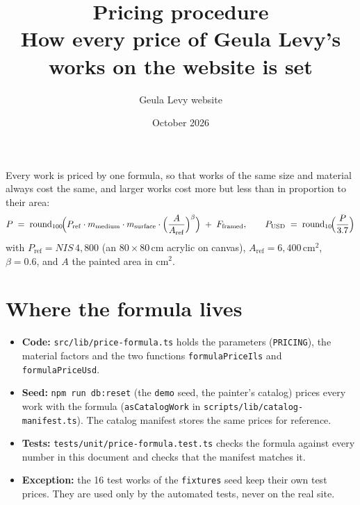 \documentclass[11pt,a4paper]{article}
\title{\textbf{Pricing procedure}\\[4pt]\large How every price of Geula Levy's works on the website
  is set}
\author{Geula Levy website}
\date{October 2026}
\newcommand{\nis}[1]{NIS\,#1}
\newcommand{\code}[1]{\nolinkurl{#1}}  %
\newcommand{\Pref}{P_{\mathrm{ref}}}
\newcommand{\Aref}{A_{\mathrm{ref}}}
\begin{document}
\maketitle

\begin{tcolorbox}[colback=lake!6,colframe=lake,title=\textbf{The rule},fonttitle=\sffamily]
Every work is priced by one formula, so that works of the same size and material always cost the
same, and larger works cost more but less than in proportion to their area:
\[
  P \;=\; \operatorname{round}_{100}\!\Bigl(\Pref \cdot m_{\text{medium}} \cdot m_{\text{surface}}
  \cdot \Bigl(\frac{A}{\Aref}\Bigr)^{\beta}\Bigr) \;+\; F_{\text{framed}},
  \qquad P_{\text{USD}} \;=\; \operatorname{round}_{10}\!\Bigl(\frac{P}{3.7}\Bigr)
\]
with $\Pref = \nis{4{,}800}$ (an $80\times80$\,cm acrylic on canvas), $\Aref = 6{,}400$\,cm$^2$,
$\beta = 0.6$, and $A$ the painted area in cm$^2$.
\end{tcolorbox}

\section{Where the formula lives}
\begin{itemize}
  \item \textbf{Code:} \code{src/lib/price-formula.ts} holds the parameters (\code{PRICING}), the
    material factors and the two functions \code{formulaPriceIls} and \code{formulaPriceUsd}.
  \item \textbf{Seed:} \texttt{npm run db:reset} (the \code{demo} seed, the painter's catalog) prices
    every work with the formula (\code{asCatalogWork} in \code{scripts/lib/catalog-manifest.ts}).
    The catalog manifest stores the same prices for reference.
  \item \textbf{Tests:} \code{tests/unit/price-formula.test.ts} checks the formula against every
    number in this document and checks that the manifest matches it.
  \item \textbf{Exception:} the 16 test works of the \code{fixtures} seed keep their own test
    prices. They are used only by the automated tests, never on the real site.
\end{itemize}
\end{document}
